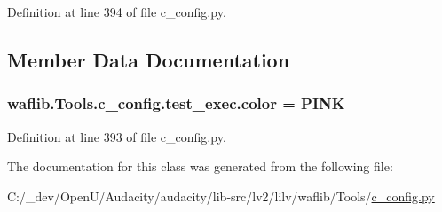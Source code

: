 Definition at line 394 of file c\+\_\+config.\+py.



\subsection{Member Data Documentation}
\subsubsection[{\texorpdfstring{color}{color}}]{ waflib.\+Tools.\+c\+\_\+config.\+test\+\_\+exec.\+color = \textquotesingle{}P\+I\+NK\textquotesingle{}\hspace{0.3cm}{\ttfamily [static]}}\hypertarget{classwaflib_1_1_tools_1_1c__config_1_1test__exec_a45ee180fe8eed668f509dfcdbab62472}{}\label{classwaflib_1_1_tools_1_1c__config_1_1test__exec_a45ee180fe8eed668f509dfcdbab62472}


Definition at line 393 of file c\+\_\+config.\+py.



The documentation for this class was generated from the following file\+:\begin{DoxyCompactItemize}
\item 
C\+:/\+\_\+dev/\+Open\+U/\+Audacity/audacity/lib-\/src/lv2/lilv/waflib/\+Tools/\hyperlink{lilv_2waflib_2_tools_2c__config_8py}{c\+\_\+config.\+py}\end{DoxyCompactItemize}
